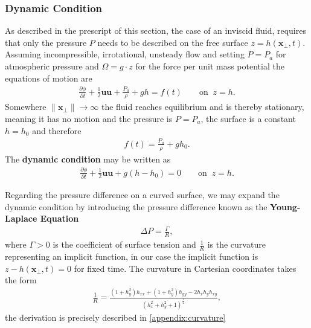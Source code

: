 \subsubsection{Dynamic Condition}
As described in the prescript of this section, the case of an inviscid fluid,
requires that only the pressure $P$ needs to be described on the free surface
$z = h(\mathbf{x}_\perp, t)$. Assuming incompressible, irrotational,
unsteady flow and setting $P=P_a$ for atmospheric pressure and $\Omega =
g\cdot z$ for the force per unit mass potential the equations of motion are
\begin{align}
    \frac{\partial \phi}{\partial t} +\frac{1}{2}\mathbf{u}\mathbf{u}
    + \frac{P_a}{\rho}+gh = f(t) \qquad \text{on}\;\; z=h.
\end{align}
Somewhere $\|\mathbf{x}_\perp\| \rightarrow \infty$ the fluid reaches
equilibrium and is thereby stationary, meaning it has no motion and the
pressure is $P=P_a$, the surface is a constant $h = h_0$ and therefore
\begin{align}
    f(t) = \frac{P_a}{\rho}+gh_0.
\end{align}
The \textbf{dynamic condition} may be written as
\begin{align}
    \frac{\partial \phi}{\partial t}
    +\frac{1}{2}\mathbf{u}\mathbf{u}+g(h-h_0) = 0 \qquad \text{on}\;\; z=h.
\end{align}

Regarding the pressure difference on a curved surface, we may expand the
dynamic condition by introducing the pressure difference known as the
\textbf{Young-Laplace Equation}
\begin{align}
    \Delta P = \frac{\Gamma}{R},
\end{align}
where $\Gamma>0$ is the coefficient of surface tension and $\frac{1}{R}$ is
the curvature representing an implicit function, in our case the implicit
function is $z - h(\mathbf{x}_\perp, t)=0$ for fixed time. The curvature in
Cartesian coordinates takes the form
\begin{align}
    \frac{1}{R} = \frac{(1+h_y^2)h_{x x}+(1+h_y^2)h_{yy} -
    2h_xh_yh_{xy}}{\left( h_x^2+h_y^2+1 \right)^{\frac{3}{2}} },
\end{align}
the derivation is precisely described in \ref{appendix:curvature}



